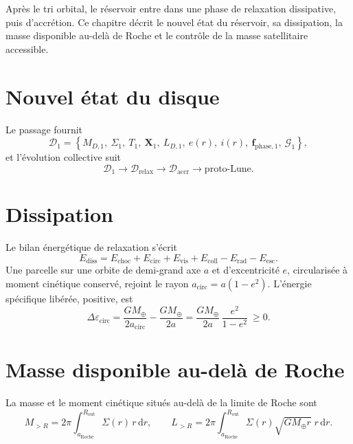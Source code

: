 \documentclass[11pt,a4paper,openany]{report}
\newcommand{\Mt}{M_{\oplus}}
\newcommand{\aR}{a_{\mathrm{Roche}}}
\newcommand{\dd}{\mathrm{d}}
\begin{document}
Après le tri orbital, le réservoir entre dans une phase de relaxation dissipative, puis d'accrétion.
Ce chapitre décrit le nouvel état du réservoir, sa dissipation, la masse disponible au-delà de Roche
et le contrôle de la masse satellitaire accessible.

\section{Nouvel état du disque}

Le passage fournit
\begin{equation}
\mathcal{D}_1=\left\{M_{D,1},\ \Sigma_1,\ T_1,\ \mathbf{X}_1,\ L_{D,1},\ e(r),\ i(r),\
\mathbf{f}_{\mathrm{phase},1},\ \mathcal{G}_1\right\},
\label{eq:D1}
\end{equation}
et l'évolution collective suit
\begin{equation}
\mathcal{D}_1\longrightarrow\mathcal{D}_{\mathrm{relax}}\longrightarrow\mathcal{D}_{\mathrm{accr}}
\longrightarrow\text{proto-Lune}.
\label{eq:evolution}
\end{equation}

\section{Dissipation}

Le bilan énergétique de relaxation s'écrit
\begin{equation}
E_{\mathrm{diss}}=E_{\mathrm{choc}}+E_{\mathrm{circ}}+E_{\mathrm{vis}}+E_{\mathrm{coll}}
-E_{\mathrm{rad}}-E_{\mathrm{esc}}.
\label{eq:Ediss}
\end{equation}
Une parcelle sur une orbite de demi-grand axe $a$ et d'excentricité $e$, circularisée à moment
cinétique conservé, rejoint le rayon $a_{\mathrm{circ}}=a(1-e^2)$. L'énergie spécifique libérée,
positive, est
\begin{equation}
\Delta\varepsilon_{\mathrm{circ}}=\frac{G\Mt}{2a_{\mathrm{circ}}}-\frac{G\Mt}{2a}
=\frac{G\Mt}{2a}\,\frac{e^2}{1-e^2}\ \ge0.
\label{eq:circ}
\end{equation}

\section{Masse disponible au-delà de Roche}

La masse et le moment cinétique situés au-delà de la limite de Roche sont
\begin{equation}
M_{>R}=2\pi\int_{\aR}^{R_{\mathrm{out}}}\Sigma(r)\,r\,\dd r,
\qquad
L_{>R}=2\pi\int_{\aR}^{R_{\mathrm{out}}}\Sigma(r)\sqrt{G\Mt r}\;r\,\dd r.
\label{eq:MR}
\end{equation}
\end{document}
